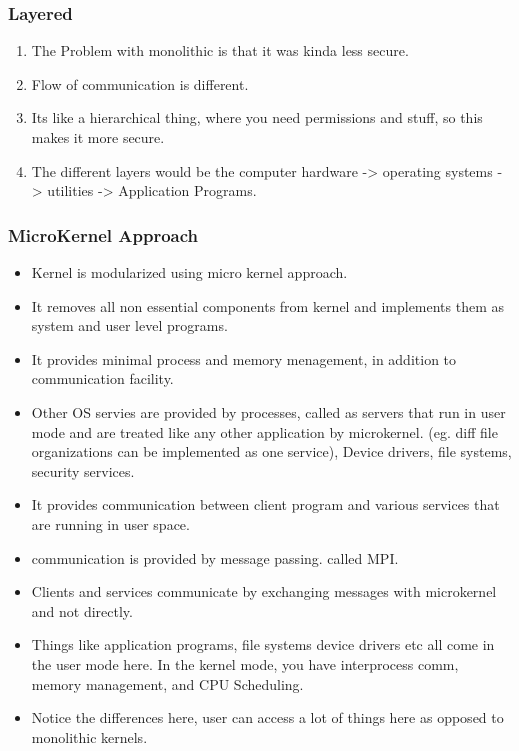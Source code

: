\documentclass[11pt]{article}
\begin{document}
\subsubsection{Layered}
\begin{enumerate}
	\item The Problem with monolithic is that it was kinda less secure.
	\item Flow of communication is different.
	\item Its like a hierarchical thing, where you need permissions and stuff, so this makes it more secure.
	\item The different layers would be the computer hardware -> operating systems -> utilities -> Application Programs.

\end{enumerate}

\subsubsection{MicroKernel Approach}
\begin{itemize}
	\item Kernel is modularized using micro kernel approach. 
	\item It removes all non essential components from kernel and implements them as system and user level programs. 
	\item It provides minimal process and memory menagement, in addition to communication facility. 
	\item Other OS servies are provided by processes, called as servers that run in user mode and are treated like any other application by microkernel. (eg. diff file organizations can be implemented as one service), Device drivers, file systems, security services. 
	\item It provides communication between client program and various services that are running in user space. 
	\item communication is provided by message passing. called MPI. 
	\item Clients and services communicate by exchanging messages with microkernel and not directly. 
	\item Things like application programs, file systems device drivers etc all come in the user mode here. In the kernel mode, you have interprocess comm, memory management, and CPU Scheduling. 
	\item Notice the differences here, user can access a lot of things here as opposed to monolithic kernels. 
\end{itemize}
\end{document}
